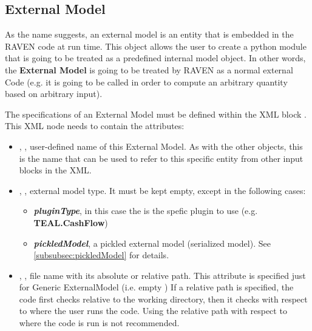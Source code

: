 \subsection{External Model}
\label{subsec:models_externalModel}
As the name suggests, an external model is an entity that is embedded in the
RAVEN code at run time.
%
This object allows the user to create a python module that is going to be
treated as a predefined internal model object.
%
In other words, the \textbf{External Model} is going to be treated by RAVEN as a
normal external Code (e.g. it is going to be called in order to compute an
arbitrary quantity based on arbitrary input).
%

The specifications of an External Model must be defined within the XML block
.
%
This XML node needs to contain the attributes:

\vspace{-5mm}
\begin{itemize}
  \itemsep0em
  \item {}, , user-defined name
  of this External Model.
  \nb As with the other objects, this is the name that can be used to refer to
  this specific entity from other input blocks in the XML.
  \item {}, , external model type. It must be kept empty, except in the following cases:
  \begin{itemize}
    \item  \textbf{\textit{pluginType}}, in this case the   is the spefic plugin to use (e.g. \textbf{TEAL.CashFlow})
    \item  \textbf{\textit{pickledModel}}, a pickled external model (serialized model). See \ref{subsubsec:pickledModel}   for details.
  \end{itemize}    
  
  \item {}, , file name
  with its absolute or relative path. This attribute is specified just for Generic ExternalModel (i.e.  empty )
  \nb If a relative path is specified, the code first checks relative
  to the working directory, then it checks with respect to where the
  user runs the code.  Using the relative path with respect to where the
  code is run is not recommended.
\end{itemize}
\vspace{-5mm}

